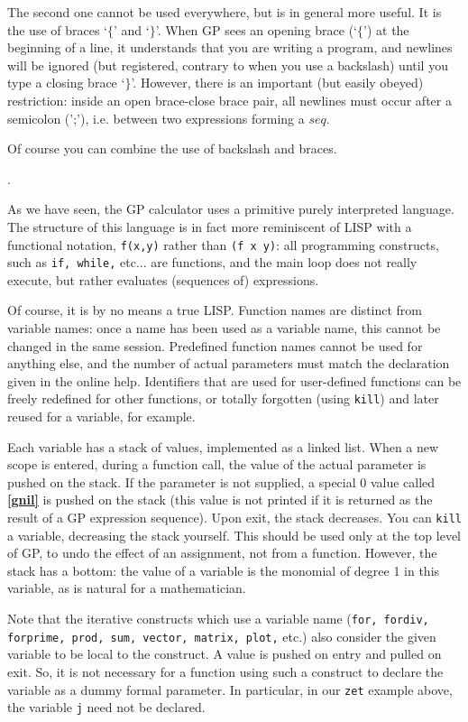 The second one cannot be used everywhere, but is in general more useful.
It is the use of braces `$\{$' and  `$\}$'.
When GP sees an opening brace (`$\{$') at the beginning of a line, it
understands that you are writing a program, and newlines will be ignored
(but registered, contrary to when you use a backslash) until you type a 
closing brace `$\}$'. However, there is an important (but easily obeyed) 
restriction: inside an open brace-close brace pair, all newlines must
occur after a semicolon (';'), i.e. between two expressions forming a
$seq$.

Of course you can combine the use of backslash and braces.

.

As we have seen, the GP calculator uses a primitive purely interpreted language.
The structure of this language is in fact more reminiscent of LISP with a functional
notation, {\tt f(x,y)} rather than {\tt (f x y)}: all programming constructs,
such as {\tt if, while,} etc... are functions, and the main loop does not really
execute, but rather evaluates (sequences of) expressions.

Of course, it is by no means a true LISP. Function names are distinct from variable
names: once a name has been used as a variable name, this cannot be changed in the
same session. Predefined function names cannot be used for anything else, and the
number of actual parameters must match the declaration given in the online help.
Identifiers that are used for user-defined functions can be freely redefined for other
functions, or totally forgotten (using {\tt kill}) and later reused for a variable,
for example.

Each variable has a stack of values, implemented as a linked list. When a new
scope is entered, during a function call,
the value of the actual parameter is pushed on the stack. If the parameter is not
supplied, a special $0$ value called {\bf \ref{gnil}} is pushed on the stack
(this value is not printed if it is
returned as the result of a GP expression sequence). Upon exit, the stack decreases.
You can {\tt kill} a variable, decreasing the stack yourself. This should be used
only at the top level of GP, to undo the effect of an assignment,
not from a function. However, the stack has a bottom:
the value of a variable is the monomial of degree 1 in
this variable, as is natural for a mathematician.

Note that the iterative constructs which use a variable name ({\tt for, fordiv,
forprime, prod, sum, vector, matrix, plot,} etc.) also consider the given
variable to be local to the construct. A value is pushed on entry and pulled on
exit. So, it is not necessary for a function using such a construct to declare
the variable as a dummy formal parameter. In particular, in our {\tt zet}
example above, the variable {\tt j} need not be declared.

